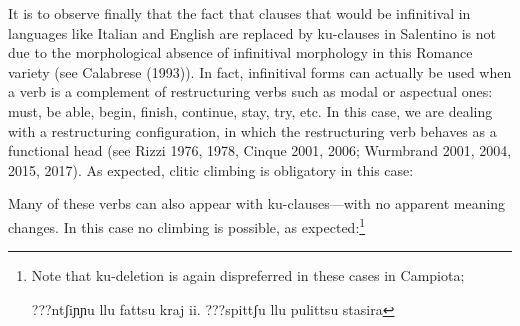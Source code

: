 \documentclass[output=paper,colorlinks,citecolor=brown,
]{langscibook}
\begin{document}
\ea
    \z
\z
    
It is to observe finally that the fact that clauses that would be infinitival in languages like Italian and English are replaced by ku-clauses in Salentino is not due to the morphological absence of infinitival morphology in this Romance variety (see Calabrese (1993)). In fact, infinitival forms can actually be used when a verb is a complement of restructuring verbs such as modal or aspectual ones: must, be able, begin, finish, continue, stay, try, etc. In this case, we are dealing with a restructuring configuration, in which the restructuring verb behaves as a functional head (see Rizzi 1976, 1978, Cinque 2001, 2006; Wurmbrand 2001, 2004, 2015, 2017).  As expected, clitic climbing is obligatory in this case:

\ea
    \z
\z

Many of these verbs can also appear with ku-clauses—with no apparent meaning changes. In this case no climbing is possible, as expected:\footnote{Note that ku-deletion is again dispreferred in these cases in Campiota;

\ea
    \ea ???ntʃiɲɲu llu fattsu kraj  
    \ex ii. ???spittʃu llu pulittsu stasira
    \z
\z

} 
\end{document}
